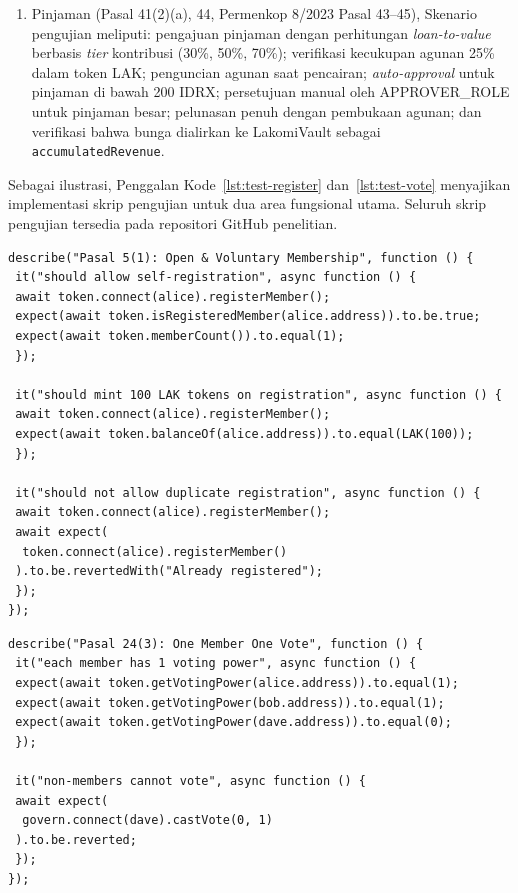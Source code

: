 \begin{enumerate}
	\item Pinjaman (Pasal 41(2)(a), 44, Permenkop 8/2023 Pasal 43--45), Skenario pengujian meliputi: pengajuan pinjaman dengan perhitungan \textit{loan-to-value} berbasis \textit{tier} kontribusi (30\%, 50\%, 70\%); verifikasi kecukupan agunan 25\% dalam token LAK; penguncian agunan saat pencairan; \textit{auto-approval} untuk pinjaman di bawah 200 IDRX; persetujuan manual oleh APPROVER\_ROLE untuk pinjaman besar; pelunasan penuh dengan pembukaan agunan; dan verifikasi bahwa bunga dialirkan ke LakomiVault sebagai \texttt{accumulatedRevenue}.
\end{enumerate}

Sebagai ilustrasi, Penggalan Kode~\ref{lst:test-register} dan~\ref{lst:test-vote} menyajikan implementasi skrip pengujian untuk dua area fungsional utama. Seluruh skrip pengujian tersedia pada repositori GitHub penelitian.

\begin{lstlisting}[language={}, caption={Skrip Pengujian: Pendaftaran Anggota (Pasal 5(1) UU 25/1992)}, label={lst:test-register}, basicstyle=\ttfamily\scriptsize, breaklines=true]
describe("Pasal 5(1): Open & Voluntary Membership", function () {
 it("should allow self-registration", async function () {
 await token.connect(alice).registerMember();
 expect(await token.isRegisteredMember(alice.address)).to.be.true;
 expect(await token.memberCount()).to.equal(1);
 });

 it("should mint 100 LAK tokens on registration", async function () {
 await token.connect(alice).registerMember();
 expect(await token.balanceOf(alice.address)).to.equal(LAK(100));
 });

 it("should not allow duplicate registration", async function () {
 await token.connect(alice).registerMember();
 await expect(
  token.connect(alice).registerMember()
 ).to.be.revertedWith("Already registered");
 });
});
\end{lstlisting}

\begin{lstlisting}[language={}, caption={Skrip Pengujian: Satu Anggota Satu Suara (Pasal 24(3) UU 25/1992)}, label={lst:test-vote}, basicstyle=\ttfamily\scriptsize, breaklines=true]
describe("Pasal 24(3): One Member One Vote", function () {
 it("each member has 1 voting power", async function () {
 expect(await token.getVotingPower(alice.address)).to.equal(1);
 expect(await token.getVotingPower(bob.address)).to.equal(1);
 expect(await token.getVotingPower(dave.address)).to.equal(0);
 });

 it("non-members cannot vote", async function () {
 await expect(
  govern.connect(dave).castVote(0, 1)
 ).to.be.reverted;
 });
});
\end{lstlisting}

